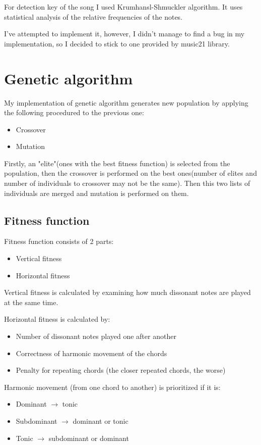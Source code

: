 \documentclass{article}
\begin{document}
For detection key of the song I used Krumhansl-Shmuckler algorithm. It uses
statistical analysis of the relative frequencies of the notes.

I've attempted to implement it, however, I didn't manage to find a bug in my
implementation, so I decided to stick to one provided by music21 library.

\section{Genetic algorithm}

My implementation of genetic algorithm generates new population by applying the
following procedured to the previous one:
\begin{itemize}
  \item Crossover
  \item Mutation
\end{itemize}

Firstly, an "elite"(ones with the best fitness function) is selected from the
population, then the crossover is performed on the best ones(number of elites
and number of individuals to crossover may not be the same). Then this two lists
of individuals are merged and mutation is performed on them.

\subsection{Fitness function}

Fitness function consists of 2 parts:
\begin{itemize}
  \item Vertical fitness
  \item Horizontal fitness
\end{itemize}

Vertical fitness is calculated by examining how much dissonant notes are played
at the same time.

Horizontal fitness is calculated by:
\begin{itemize}
  \item Number of dissonant notes played one after another
  \item Correctness of harmonic movement of the chords
  \item Penalty for repeating chords (the closer repeated chords, the worse)
\end{itemize}

Harmonic movement (from one chord to another) is prioritized if it is:
\begin{itemize}
  \item Dominant $\rightarrow$ tonic
  \item Subdominant $\rightarrow$ dominant or tonic
  \item Tonic $\rightarrow$ subdominant or dominant
\end{itemize}
\end{document}
